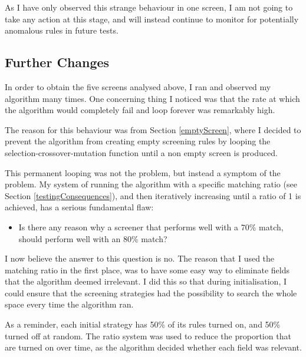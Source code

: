 \noindent As I have only observed this strange behaviour in one screen, I am not going to take any action at this stage, and will instead continue to monitor for potentially anomalous rules in future tests.

\subsection{Further Changes}
In order to obtain the five screens analysed above, I ran and observed my algorithm many times. One concerning thing I noticed was that the rate at which the algorithm would completely fail and loop forever was remarkably high. \newline

The reason for this behaviour was from Section \ref{emptyScreen}, where I decided to prevent the algorithm from creating empty screening rules by looping the selection-crossover-mutation function until a non empty screen is produced. \newline

This permanent looping was not the problem, but instead a symptom of the problem. My system of running the algorithm with a specific matching ratio (see Section \ref{testingConsequences}), and then iteratively increasing until a ratio of 1 is achieved, has a serious fundamental flaw:
\begin{itemize}
    \item Is there any reason why a screener that performs well with a 70\% match, should perform well with an 80\% match?
\end{itemize}

I now believe the answer to this question is no. The reason that I used the matching ratio in the first place, was to have some easy way to eliminate fields that the algorithm deemed irrelevant. I did this so that during initialisation, I could ensure that the screening strategies had the possibility to search the whole space every time the algorithm ran. \newline

As a reminder, each initial strategy has 50\% of its rules turned on, and 50\% turned off at random. The ratio system was used to reduce the proportion that are turned on over time, as the algorithm decided whether each field was relevant. \newline

